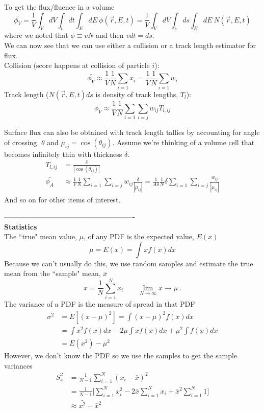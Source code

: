 \documentclass[12pt]{article}
\newcommand{\rvec}{\ensuremath{\vec{r}}}
\begin{document}
To get the flux/fluence in a volume
\[
\bar{\phi_V} = \frac{1}{V}\int_V dV \int_t dt \int_E dE\: \phi(\rvec, E,t) =  \frac{1}{V}\int_V dV \int_s ds \int_E dE\: N(\rvec, E,t)
\]
where we noted that $\phi \equiv vN$ and then $vdt = ds$.\\
We can now see that we can use either a collision or a track length estimator for flux.\\
Collision (score happens at collision of particle $i$):
\[
\bar{\phi_V} \approx \frac{1}{V}\frac{1}{N} \sum_{i=1} x_i = \frac{1}{V}\frac{1}{N} \sum_{i=1} w_i
\]
Track length ($N(\rvec, E,t)ds$ is density of track lengths, $T_l$):
\[
\bar{\phi_V} \approx \frac{1}{V}\frac{1}{N} \sum_{i=1}\sum_{i=j} w_{ij}T_{l,ij}
\]

Surface flux can also be obtained with track length tallies by accounting for angle of crossing, $\theta$ and $\mu_{ij} = \cos(\theta_{ij})$. Assume we're thinking of a volume cell that becomes infinitely thin with thickness $\delta$. 
\begin{align*}
T_{l,ij} &= \frac{\delta}{|\cos(\theta_{ij})|}\\
\bar{\phi_A} &\approx \frac{1}{V}\frac{1}{N} \sum_{i=1}\sum_{i=j} w_{ij}\frac{\delta}{|\mu_{ij}|} = \frac{1}{A \delta}\frac{1}{N} \delta \sum_{i=1}\sum_{i=j} \frac{w_{ij}}{|\mu_{ij}|}
\end{align*}
%
And so on for other items of interest.


\clearpage
-------------------------------------------------------\\
\textbf{Statistics}\\
The ``true" mean value, $\mu$, of any PDF is the expected value, $E(x)$
\[
\mu = E(x) = \int x f(x) dx
\]
Because we can't usually do this, we use random samples and estimate the true mean from the ``sample" mean, $\bar{x}$
\[
\bar{x} = \frac{1}{N}\sum_{i=1}^N x_i \qquad \lim_{N \to \infty} \bar{x} \rightarrow \mu\:.
\]
The variance of a PDF is the measure of spread in that PDF
\begin{align*}
\sigma^2 &= E[(x - \mu)^2] = \int (x - \mu)^2 f(x) dx \\
&= \int x^2 f(x) dx - 2 \mu \int x f(x) dx + \mu^2 \int f(x) dx\\
&= E(x^2) - \mu^2
\end{align*}
%
However, we don't know the PDF so we use the samples to get the sample variances
\begin{align*}
S_x^2 &= \frac{1}{N-1}\sum_{i=1}^N (x_i - \bar{x})^2 \\
&= \frac{1}{N-1} \biggl[\sum_{i=1}^N x_i^2 - 2 \bar{x}\sum_{i=1}^N x_i + \bar{x}^2 \sum_{i=1}^N 1 \biggr] \\
&\approx \bar{x^2} - \bar{x}^2
\end{align*}
\end{document}
